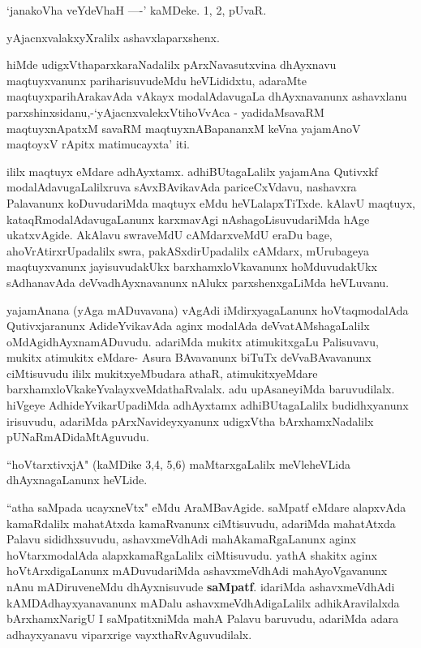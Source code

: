 \begin{artha}
`janakoVha veYdeVhaH ----' kaMDeke. 1, 2, pUvaR.

yAjacnxvalakxyXralilx ashavxlaparxshenx.

hiMde udigxVthaparxkaraNadalilx pArxNavasutxvina dhAyxnavu maqtuyxvanunx 
parihari\-suvudeMdu heVLididxtu, adaraMte maqtuyxparihArakavAda vAkayx modalAdavugaLa 
dhAyxnavanunx ashavxlanu parxshinxsidanu,-`yAjacnxvalekxVtihoVvAca - yadidaMsavaRM maqtuyxnA\s\s patxM savaRM maqtuyxnA\s BapananxM keVna yajamAnoV maqtoyxV rApitx matimucayxta' iti.

ililx maqtuyx eMdare adhAyxtamx. adhiBUtagaLalilx yajamAna Qutivxkf 
modalAda\-vugaLalilxruva sAvxBAvikavAda pariceCxVdavu, nashavxra Palavanunx koDuvudariMda 
maqtuyx eMdu heVLalapxTiTxde. kAlavU maqtuyx, kataqRmodalAdavugaLanunx karxmavAgi 
nAshagoLisuvudariMda hAge ukatxvAgide. AkAlavu swraveMdU cAMdarxveMdU eraDu bage, 
ahoVrAtirxrUpadalilx swra, pakASxdirUpadalilx cAMdarx, mUrubageya maqtuyxvanunx 
jayisuvudakUkx barxhamxloVkavanunx hoMduvudakUkx sAdhanavAda deVvadhAyxnavanunx nAlukx 
parxshenxgaLiMda heVLuvanu.
\end{artha}

\centerline{}

\begin{artha}
yajamAnana (yAga mADuvavana) vAgAdi iMdirxyagaLanunx hoVtaq\-modalAda Qutivxjaranunx AdideYvikavAda aginx modalAda deVvatAMshagaLalilx oMdAgidhAyxnamADuvudu. adariMda mukitx atimukitxgaLu Palisuvavu, mukitx atimukitx eMdare- Asura BAvavanunx biTuTx deVvaBAvavanunx ciMtisuvudu ililx mukitxyeMbudara athaR, atimukitxyeMdare barxhamxloVkakeYvalayxveMdathaRvalalx. adu upAsaneyiMda baruvudilalx. hiVgeye AdhideYvikarUpadiMda adhAyxtamx adhiBUtagaLalilx budidhxyanunx irisuvudu, adariMda pArxNavideyxyanunx udigxVtha bArxhamxNadalilx pUNaRmADidaMtAguvudu.
\end{artha}

\begin{artha}
``hoVtarxtivxjA" (kaMDike 3,4, 5,6) maMtarxgaLalilx meVleheVLida dhAyxnagaLanunx heVLide.
\end{artha}

\centerline{}

\begin{artha}
``atha saMpada ucayxneVtx" eMdu AraMBavAgide. saMpatf eMdare alapxvAda kamaR\-dalilx mahatAtxda kamaRvanunx ciMtisuvudu, adariMda mahatAtxda Palavu sididhx\-suvudu, ashavxmeVdhAdi mahAkamaRgaLanunx aginx hoVtarxmodalAda alapxkamaR\-gaLalilx ciMtisuvudu.  yathA shakitx aginx hoVtArxdigaLanunx mADuvudariMda ashavxmeVdhAdi mahAyoVgavanunx nAnu mADiruveneMdu dhAyxnisuvude \textbf{saMpatf}. idariMda ashavx\-meVdhAdi kAMDAdhayxyanavanunx mADalu ashavxmeVdhAdigaLalilx adhikAravilalxda bArxhamxNa\-rigU I saMpatitxniMda mahA Palavu baruvudu, adariMda adara adhayxyanavu viparxrige vayxthaRvAguvudilalx.
\end{artha}

